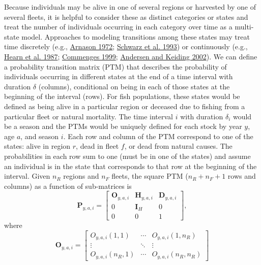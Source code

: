 \documentclass[
]{article}
\begin{document}
Because individuals may be alive in one of several regions or harvested by one of several fleets, it is helpful to consider these as distinct categories or states and treat the number of individuals occurring in each category over time as a multi-state model. Approaches to modeling transitions among these states may treat time discretely (e.g., \protect\hyperlink{ref-arnason72}{Arnason 1972}; \protect\hyperlink{ref-schwarzetal93}{Schwarz et al. 1993}) or continuously (e.g., \protect\hyperlink{ref-hearnetal87}{Hearn et al. 1987}; \protect\hyperlink{ref-commenges99}{Commenges 1999}; \protect\hyperlink{ref-andersenkeiding02}{Andersen and Keiding 2002}). We can define a probability transition matrix (PTM) that describes the probability of individuals occurring in different states at the end of a time interval with duration \(\delta\) (columns), conditional on being in each of those states at the beginning of the interval (rows). For fish populations, these states would be defined as being alive in a particular region or deceased due to fishing from a particular fleet or natural mortality. The time interval \(i\) with duration \(\delta_i\) would be a season and the PTMs would be uniquely defined for each stock by year \(y\), age \(a\), and season \(i\). Each row and column of the PTM correspond to one of the states: alive in region \(r\), dead in fleet \(f\), or dead from natural causes. The probabilities in each row sum to one (must be in one of the states) and assume an individual is in the state that corresponds to that row at the beginning of the interval. Given \(n_R\) regions and \(n_F\) fleets, the square PTM (\(n_R + n_F + 1\) rows and columns) as a function of sub-matrices is
\begin{equation}\label{eq:ptm}
  \mathbf{P}_{y,a,i} = \begin{bmatrix}
    \mathbf{O}_{y,a,i} & \mathbf{H}_{y,a,i} & \mathbf{D}_{y,a,i} \\
    0 & \mathbf{I}_{H} & 0\\
    0 & 0 & 1
  \end{bmatrix},
\end{equation}
where
\begin{equation*}
  \mathbf{O}_{y,a,i} = 
  \begin{bmatrix}
    O_{y,a,i}(1,1) & \cdots & O_{y,a,i}(1,n_R) \\
    \vdots & \ddots & \vdots \\
    O_{y,a,i}(n_R,1) & \cdots & O_{y,a,i}(n_R,n_R)
  \end{bmatrix}
\end{equation*}
\end{document}
